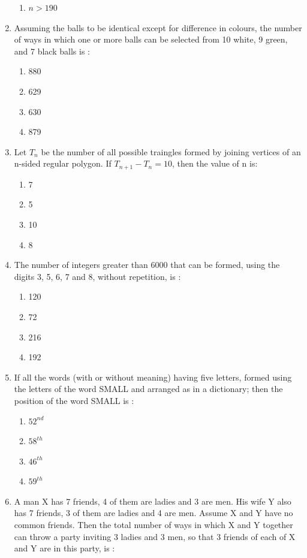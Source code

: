 \documentclass[journal,12pt,twocolumn]{IEEEtran}
\begin{document}
\begin{enumerate}
\begin{enumerate}
\item $n > 190$\\
\end{enumerate}  
\item Assuming the balls to be identical except for difference in colours, the number of ways in which one  or more balls can be selected from 10 white, 9 green, and 7 black balls is :
\begin{enumerate}
\item 880
\item 629
\item 630
\item 879\\
\end{enumerate}
\item Let $T_n$ be the number of all possible traingles formed by joining vertices of an n-sided regular polygon. If $T_{n+1}-T_n = 10$, then the value of n is:
\begin{enumerate}
\item 7
\item 5
\item 10
\item 8\\
\end{enumerate}
\item The number of integers greater than 6000 that can be formed, using the digits 3, 5, 6, 7 and 8, without repetition, is :
\begin{enumerate}
\item 120
\item 72
\item 216
\item 192\\
\end{enumerate}
\item If all the words (with or without meaning) having five letters, formed using the letters of the word SMALL and arranged as in a dictionary; then the position of the word SMALL is :
\begin{enumerate}
\item $52^{nd}$
\item $58^{th}$
\item $46^{th}$
\item $59^{th}$\\
\end{enumerate}
\item A man X has 7 friends, 4 of them are ladies and 3 are men. His wife Y also has 7 friends, 3 of them are ladies and 4 are men. Assume X and Y have no common friends. Then the total number of ways in which X and Y together can throw a party inviting 3 ladies and 3 men, so that 3 friends of each of X and Y are in this party, is :

\end{enumerate}
\end{document}
